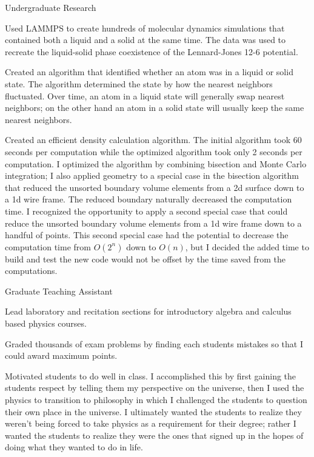 \begin{cventries}
\vspace{-5mm}
\cventry
{Undergraduate Research} %
{} %
{} %
{} %
{ %
\begin{cvitems}
\item {Used LAMMPS to create hundreds of molecular dynamics simulations that contained both a liquid and a solid at the same time. The data was used to recreate the liquid-solid phase coexistence of the Lennard-Jones 12-6 potential.}
\item {Created an algorithm that identified whether an atom was in a liquid or solid state. The algorithm determined the state by how the nearest neighbors fluctuated. Over time, an atom in a liquid state will generally swap nearest neighbors; on the other hand an atom in a solid state will usually keep the same nearest neighbors.}
\item {Created an efficient density calculation algorithm. The initial algorithm took 60 seconds per computation while the optimized algorithm took only 2 seconds per computation. I optimized the algorithm by combining bisection and Monte Carlo integration; I also applied geometry to a special case in the bisection algorithm that reduced the unsorted boundary volume elements from a 2d surface down to a 1d wire frame. The reduced boundary naturally decreased the computation time. I recognized the opportunity to apply a second special case that could reduce the unsorted boundary volume elements from a 1d wire frame down to a handful of points. This second special case had the potential to decrease the computation time from $O(2^n)$ down to $O(n)$, but I decided the added time to build and test the new code would not be offset by the time saved from the computations.}
\end{cvitems}
}

\vspace{-6mm}
\cventry
{Graduate Teaching Assistant} %
{} %
{} %
{} %
{ %
\begin{cvitems}
\item {Lead laboratory and recitation sections for introductory algebra and calculus based physics courses.}
\item {Graded thousands of exam problems by finding each students mistakes so that I could award maximum points.}
\item {Motivated students to do well in class. I accomplished this by first gaining the students respect by telling them my perspective on the universe, then I used the physics to transition to philosophy in which I challenged the students to question their own place in the universe. I ultimately wanted the students to realize they weren't being forced to take physics as a requirement for their degree; rather I wanted the students to realize they were the ones that signed up in the hopes of doing what they wanted to do in life.}
\end{cvitems}
}


\end{cventries}
